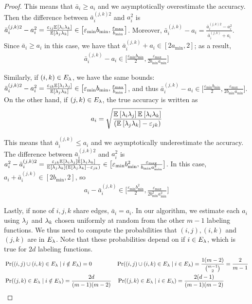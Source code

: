 \begin{proof}
This means that $\bar{a}_i \ge a_i$ and we asymptotically overestimate the accuracy. Then the difference  between $\bar{a}_i^{(j,k) 2}$ and $a_i^2$ is
$\bar{a}_i^{(j, k) 2} - a_i^2 = \frac{\varepsilon_{ij} \mathbb{E}_{}\left[\lambda_i \lambda_k\right]}{\mathbb{E}_{}\left[\lambda_j \lambda_k\right]} \in \big[\varepsilon_{\min} b_{\min}, \frac{\varepsilon_{\max}}{b_{\min}}\big]$. Moreover, $\bar{a}_i^{(j, k)} - a_i = \frac{\bar{a}_i^{(j, k) 2} - a_i^2}{\bar{a}_i^{(j, k)} + a_i}$. Since $\bar{a}_i \ge a_i$ in this case, we have that $\bar{a}_i^{(j, k)} + a_i \in [2a_{\min}, 2]$; as a result,
\begin{align}
\bar{a}_i^{(j, k)} - a_i \in \big[ \frac{\varepsilon_{\min} b_{\min}}{2}, \frac{\varepsilon_{\max}}{2 b_{\min} a_{\min}}\big] \label{eq:acc_diff_ij}
\end{align}

Similarly, if $(i,k) \in E_{\lambda}$, we have the same bounds: $\bar{a}_i^{(j, k)2} - a_i^2 = \frac{\varepsilon_{ik} \mathbb{E}_{}\left[\lambda_i \lambda_j\right]}{\mathbb{E}_{}\left[\lambda_j \lambda_k\right]} \in \big[\varepsilon_{\min} b_{\min}, \frac{\varepsilon_{\max}}{b_{\min}}\big]$, and thus $\bar{a}_i^{(j, k)} - a_i \in \big[ \frac{\varepsilon_{\min} b_{\min}}{2}, \frac{\varepsilon_{\max}}{2 b_{\min} a_{\min}}\big]$. On the other hand, if $(j, k) \in E_{\lambda}$, the true accuracy is written as
\begin{align*}
a_i = \sqrt{\frac{\mathbb{E}_{}\left[\lambda_i \lambda_j\right] \mathbb{E}_{}\left[\lambda_i \lambda_k\right]}{(\mathbb{E}_{}\left[\lambda_j \lambda_k\right]- \varepsilon_{jk})} }
\end{align*}

This means that $\bar{a}_i^{(j, k)} \le a_i$ and we asymptotically underestimate the accuracy. The difference between $\bar{a}_i^{(j, k) 2}$ and $a_i^2$ is $a_i^2 - \bar{a}_i^{(j, k) 2}  = \frac{\varepsilon_{jk} \mathbb{E}_{}\left[\lambda_i \lambda_j\right] \mathbb{E}_{}\left[\lambda_i \lambda_k\right]}{\mathbb{E}_{}\left[\lambda_j \lambda_k\right](\mathbb{E}_{}\left[\lambda_j \lambda_k\right] - \varepsilon_{jk})} \in \big[\varepsilon_{\min} b_{\min}^2, \frac{\varepsilon_{\max}}{b_{\min}a_{\min}^2} \big]$. In this case, $a_i + \bar{a}_i^{(j, k)} \in [2b_{\min}, 2]$, so 
\begin{align}
a_i - \bar{a}_i^{(j, k)} \in \Big[\frac{\varepsilon_{\min} b_{\min}^2}{2}, \frac{\varepsilon_{\max}}{2b_{\min}^2 a_{\min}^2} \Big]
\label{eq:acc_diff_jk}
\end{align}

Lastly, if none of $i, j, k$ share edges, $\bar{a}_i = a_i$. In our algorithm, we estimate each $a_i$ using $\lambda_j$ and $\lambda_k$ chosen uniformly at random from the other $m - 1$ labeling functions. We thus need to compute the probabilities that $(i, j), (i, k)$ and $(j, k)$ are in $E_{\lambda}$. Note that these probabilities depend on if $i \in E_{\lambda}$, which is true for $2d$ labeling functions. 
\begin{align}
    &\Pr((i, j) \cup (i, k) \in E_{\lambda} \; | \; i \notin E_{\lambda}) = 0 \qquad \qquad \; \Pr((i, j) \cup (i, k) \in E_{\lambda} \; | \; i \in E_{\lambda}) = \frac{1(m - 2)}{{m - 1 \choose 2}} =  \frac{2}{m - 1} \nonumber \\
    &\Pr((j, k) \in E_{\lambda} \;| \; i \notin E_{\lambda}) = \frac{2d}{(m - 1)(m - 2)}  \quad \Pr((j, k) \in E_{\lambda} \;| \; i \in E_{\lambda}) = \frac{2(d - 1)}{(m - 1)(m - 2)} \nonumber
\end{align} 


\end{proof}

